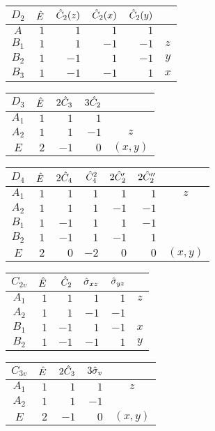 \documentclass[../../Atom-ogMolekylefysik.tex]{subfiles}
\begin{document}
\begin{tabular}{c|r r r r|c}
     $D_2$ & $\hat E$ & $\hat C_2(z)$ & $\hat C_2(x)$ & $\hat C_2(y)$\\\hline
     $A$ & $1$ & $1$ & $1$ & $1$\\
     $B_1$ & $1$ & $1$ & $-1$ & $-1$ & $z$\\
     $B_2$ & $1$ & $-1$ & $1$& $-1$ & $y$\\
     $B_3$ & $1$ & $-1$ & $-1$ & $1$ & $x$
\end{tabular}

\vspace{1cm}

\begin{tabular}{c|r r r|c}
    $D_3$ & $\hat E$& $2\hat C_3$ & $3\hat C_2$\\\hline
    $A_1$ & $1$ & $1$ & $1$\\
    $A_2$ & $1$ & $1$& $-1$& $z$\\
    $E$ & $2$ & $-1$ & $0$ & $(x,y)$
\end{tabular}



\begin{tabular}{c|r r r r r|c}
$D_4$ & $\hat E$ & $2\hat C_4$ & $\hat C_4^2$ & $2\hat C_2'$ & $2\hat C_2''$\\\hline
$A_1$ & $1$ & $1$ & $1$ & $1$ & $1$ & $z$\\
$A_2$ & $1$ & $1$ & $1$ & $-1$ & $-1$\\
$B_1$ & $1$ & $-1$ & $1$ & $1$ &  $-1$\\
$B_2$ & $1$ & $-1$ & $1$ & $-1$ & $1$\\
$E$ & $2$ & $0$ & $-2$ & $0$ & $0$ & $(x,y)$
\end{tabular}

\vspace{1cm}

\begin{tabular}{c|r r r r|c}
$C_{2v}$ & $\hat E$ & $\hat C_2$ & $\hat \sigma_{xz}$ & $\hat \sigma_{yz}$\\\hline
$A_1$ & $1$& $1$& $1$ & $1$ & $z$\\
$A_2$ & $1$ & $1$ & $-1$ & $-1$\\
$B_1$ & $1$ & $-1$ & $1$ & $-1$ & $x$\\
$B_2$ & $1$ & $-1$ & $-1$ & $1$ & $y$
\end{tabular}

\vspace{1cm}

\begin{tabular}{c|r r r|c}
$C_{3v}$ & $\hat E$ & $2\hat C_3$ & $3\hat \sigma_v$\\\hline
$A_1$ & $1$ & $1$ & $1$ & $z$\\
$A_2$ & $1$ & $1$ & $-1$ \\
$E$ & $2$ & $-1$ & $0$& $(x,y)$
\end{tabular}
\end{document}
